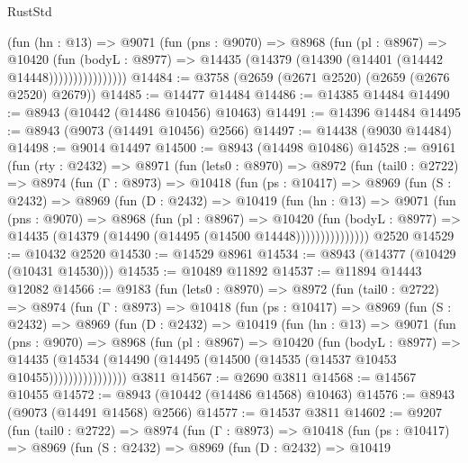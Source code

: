 \begin{lexlean}{RustStd}
\begin{coremodule}
                    (fun (hn : @13) =>
                    @9071
                      (fun (pns : @9070) =>
                      @8968
                        (fun (pl : @8967) =>
                        @10420
                          (fun (bodyL : @8977) =>
                          @14435 (@14379 (@14390 (@14401 (@14442 @14448))))))))))))))))
@14484 := @3758 (@2659 (@2671 @2520) (@2659 (@2676 @2520) @2679))
@14485 := @14477 @14484
@14486 := @14385 @14484
@14490 := @8943 (@10442 (@14486 @10456) @10463)
@14491 := @14396 @14484
@14495 := @8943 (@9073 (@14491 @10456) @2566)
@14497 := @14438 (@9030 @14484)
@14498 := @9014 @14497
@14500 := @8943 (@14498 @10486)
@14528 := @9161
    (fun (rty : @2432) =>
    @8971
      (fun (lets0 : @8970) =>
      @8972
        (fun (tail0 : @2722) =>
        @8974
          (fun (Γ : @8973) =>
          @10418
            (fun (ps : @10417) =>
            @8969
              (fun (S : @2432) =>
              @8969
                (fun (D : @2432) =>
                @10419
                  (fun (hn : @13) =>
                  @9071
                    (fun (pns : @9070) =>
                    @8968
                      (fun (pl : @8967) =>
                      @10420
                        (fun (bodyL : @8977) =>
                        @14435 (@14379 (@14490 (@14495 (@14500 @14448)))))))))))))))
    @2520
@14529 := @10432 @2520
@14530 := @14529 @8961
@14534 := @8943 (@14377 (@10429 (@10431 @14530)))
@14535 := @10489 @11892
@14537 := @11894 @14443 @12082
@14566 := @9183
    (fun (lets0 : @8970) =>
    @8972
      (fun (tail0 : @2722) =>
      @8974
        (fun (Γ : @8973) =>
        @10418
          (fun (ps : @10417) =>
          @8969
            (fun (S : @2432) =>
            @8969
              (fun (D : @2432) =>
              @10419
                (fun (hn : @13) =>
                @9071
                  (fun (pns : @9070) =>
                  @8968
                    (fun (pl : @8967) =>
                    @10420
                      (fun (bodyL : @8977) =>
                      @14435
                        (@14534
                          (@14490 (@14495 (@14500 (@14535 (@14537 @10453 @10455))))))))))))))))
    @3811
@14567 := @2690 @3811
@14568 := @14567 @10455
@14572 := @8943 (@10442 (@14486 @14568) @10463)
@14576 := @8943 (@9073 (@14491 @14568) @2566)
@14577 := @14537 @3811
@14602 := @9207
    (fun (tail0 : @2722) =>
    @8974
      (fun (Γ : @8973) =>
      @10418
        (fun (ps : @10417) =>
        @8969
          (fun (S : @2432) =>
          @8969
            (fun (D : @2432) =>
            @10419

\end{coremodule}
\end{lexlean}
